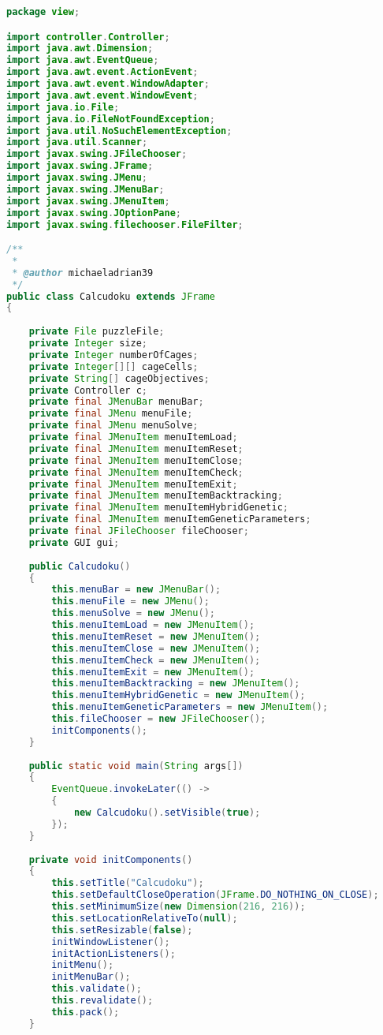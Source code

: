 \begin{lstlisting}[language=Java,basicstyle=\tiny,caption=Calcudoku.java]
package view;

import controller.Controller;
import java.awt.Dimension;
import java.awt.EventQueue;
import java.awt.event.ActionEvent;
import java.awt.event.WindowAdapter;
import java.awt.event.WindowEvent;
import java.io.File;
import java.io.FileNotFoundException;
import java.util.NoSuchElementException;
import java.util.Scanner;
import javax.swing.JFileChooser;
import javax.swing.JFrame;
import javax.swing.JMenu;
import javax.swing.JMenuBar;
import javax.swing.JMenuItem;
import javax.swing.JOptionPane;
import javax.swing.filechooser.FileFilter;

/**
 *
 * @author michaeladrian39
 */
public class Calcudoku extends JFrame
{
    
    private File puzzleFile;
    private Integer size;
    private Integer numberOfCages;
    private Integer[][] cageCells;
    private String[] cageObjectives;
    private Controller c;
    private final JMenuBar menuBar;
    private final JMenu menuFile;
    private final JMenu menuSolve;
    private final JMenuItem menuItemLoad;
    private final JMenuItem menuItemReset;
    private final JMenuItem menuItemClose;
    private final JMenuItem menuItemCheck;
    private final JMenuItem menuItemExit;
    private final JMenuItem menuItemBacktracking;
    private final JMenuItem menuItemHybridGenetic;
    private final JMenuItem menuItemGeneticParameters;
    private final JFileChooser fileChooser;
    private GUI gui;
    
    public Calcudoku()
    {        
        this.menuBar = new JMenuBar();
        this.menuFile = new JMenu();
        this.menuSolve = new JMenu();
        this.menuItemLoad = new JMenuItem();
        this.menuItemReset = new JMenuItem();
        this.menuItemClose = new JMenuItem();
        this.menuItemCheck = new JMenuItem();
        this.menuItemExit = new JMenuItem();
        this.menuItemBacktracking = new JMenuItem();
        this.menuItemHybridGenetic = new JMenuItem();
        this.menuItemGeneticParameters = new JMenuItem();
        this.fileChooser = new JFileChooser();
        initComponents();
    }
    
    public static void main(String args[])
    {
        EventQueue.invokeLater(() ->
        {
            new Calcudoku().setVisible(true);
        });
    }
    
    private void initComponents()
    { 
        this.setTitle("Calcudoku");
        this.setDefaultCloseOperation(JFrame.DO_NOTHING_ON_CLOSE);
        this.setMinimumSize(new Dimension(216, 216));
        this.setLocationRelativeTo(null);
        this.setResizable(false);
        initWindowListener();
        initActionListeners();
        initMenu();
        initMenuBar();
        this.validate();
        this.revalidate();
        this.pack();
    }


\end{lstlisting}
